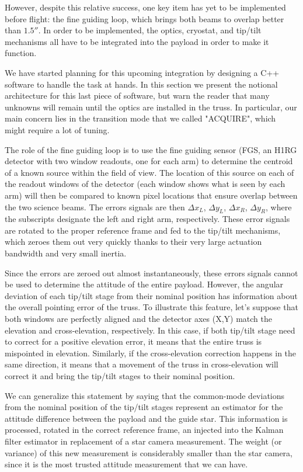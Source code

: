 However, despite this relative success, one key item has yet to be implemented before flight: the fine guiding loop, which brings both beams to overlap better than $\ang{;;1.5}$. In order to be implemented, the optics, cryostat, and tip/tilt mechanisms all have to be integrated into the payload in order to make it function.

We have started planning for this upcoming integration by designing a C++ software to handle the task at hands. In this section we present the notional architecture for this last piece of software, but warn the reader that many unknowns will remain until the optics are installed in the truss. In particular, our main concern lies in the transition mode that we called "ACQUIRE", which might require a lot of tuning. 

The role of the fine guiding loop is to use the fine guiding sensor (FGS, an H1RG detector with two window readouts, one for each arm) to determine the centroid of a known source within the field of view. The location of this source on each of the readout windows of the detector (each window shows what is seen by each arm) will then be compared to known pixel locations that ensure overlap between the two science beams. The errors signals are then $\Delta x_L$, $\Delta y_L$, $\Delta x_R$, $\Delta y_R$, where the subscripts designate the left and right arm, respectively. These error signals are rotated to the proper reference frame and fed to the tip/tilt mechanisms, which zeroes them out very quickly thanks to their very large actuation bandwidth and very small inertia. 

Since the errors are zeroed out almost instantaneously, these errors signals cannot be used to determine the attitude of the entire payload. However, the angular deviation of each tip/tilt stage from their nominal position has information about the overall pointing error of the truss. To illustrate this feature, let's suppose that both windows are perfectly aligned and the detector axes (X,Y) match the elevation and cross-elevation, respectively. In this case, if both tip/tilt stage need to correct for a positive elevation error, it means that the entire truss is mispointed in elevation. Similarly, if the cross-elevation correction happens in the same direction, it means that a movement of the truss in cross-elevation will correct it and bring the tip/tilt stages to their nominal position.

We can generalize this statement by saying that the common-mode deviations from the nominal position of the tip/tilt stages represent an estimator for the attitude difference between the payload and the guide star. This information is processed, rotated in the correct reference frame, an injected into the Kalman filter estimator in replacement of a star camera measurement. The weight (or variance) of this new measurement is considerably smaller than the star camera, since it is the most trusted attitude measurement that we can have. 

